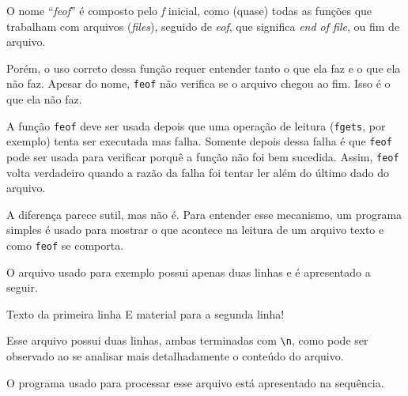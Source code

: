 \documentclass[
  11pt,
  a4paper,
]{scrbook}
\newenvironment{Shaded}{\begin{snugshade}}{\end{snugshade}}
\newcommand{\KeywordTok}[1]{\textcolor[rgb]{0.13,0.29,0.53}{\textbf{#1}}}
\newcommand{\NormalTok}[1]{#1}
\begin{document}
 O nome ``\emph{feof}'' é composto pelo
\emph{f} inicial, como (quase) todas as funções que trabalham com
arquivos (\emph{files}), seguido de \emph{eof}, que significa \emph{end
of file}, ou fim de arquivo.

Porém, o uso correto dessa função requer entender tanto o que ela faz e
o que ela não faz. Apesar do nome, \texttt{feof} não verifica se o
arquivo chegou ao fim. Isso é o que ela não faz.

A função \texttt{feof} deve ser usada depois que uma operação de leitura
(\texttt{fgets}, por exemplo) tenta ser executada mas falha. Somente
depois dessa falha é que \texttt{feof} pode ser usada para verificar
porquê a função não foi bem sucedida. Assim, \texttt{feof} volta
verdadeiro quando a razão da falha foi tentar ler além do último dado do
arquivo.

A diferença parece sutil, mas não é. Para entender esse mecanismo, um
programa simples é usado para mostrar o que acontece na leitura de um
arquivo texto e como \texttt{feof} se comporta.

O arquivo usado para exemplo possui apenas duas linhas e é apresentado a
seguir.

\begin{Shaded}
\begin{Highlighting}[]
\NormalTok{Texto da primeira linha}
\NormalTok{E material para a segunda linha!}
\end{Highlighting}
\end{Shaded}

Esse arquivo possui duas linhas, ambas terminadas com
\texttt{\textbackslash{}n}, como pode ser observado ao se analisar mais
detalhadamente o conteúdo do arquivo.

\begin{Shaded}
\end{Shaded}

O programa usado para processar esse arquivo está apresentado na
sequência.
\end{document}
